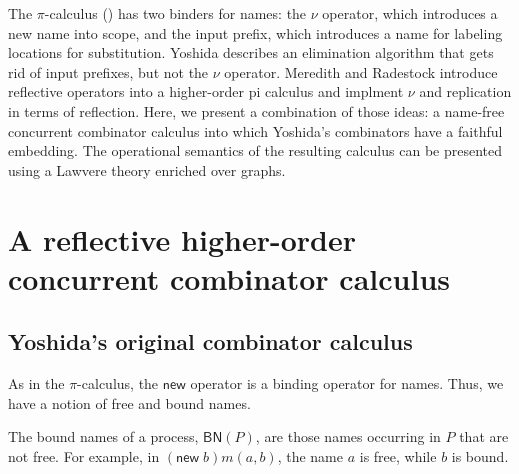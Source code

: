 \documentclass{llncs}
\newcommand{\pic}{$\pi$-calculus}
\newcommand{\pzero}{\mathbin{0}}
\newcommand{\freenames}[1]{\mathbin{\mathsf{FN}(#1)}}
\newcommand{\boundnames}[1]{\mathbin{\mathsf{BN}(#1)}}
\newcommand{\bc}{\mathbin{\mathbf{::=}}}
\newcommand{\bm}{\mathbin{\mathbf\mid}}
\begin{document}
  The {\pic} (\cite{milner91polyadicpi}) has two binders for names: the $\nu$ operator, which introduces a new name into scope, and the input prefix, which introduces a name for labeling locations for substitution.  Yoshida \cite{DBLP:journals/tcs/Yoshida02} describes an elimination algorithm that gets rid of input prefixes, but not the $\nu$ operator.  Meredith and Radestock \cite{DBLP:journals/entcs/MeredithR05} introduce reflective operators into a higher-order pi calculus and implment $\nu$ and replication in terms of reflection.  Here, we present a combination of those ideas: a name-free concurrent combinator calculus into which Yoshida's combinators have a faithful embedding.  The operational semantics of the resulting calculus can be presented using a Lawvere theory enriched over graphs.

\section{A reflective higher-order concurrent combinator calculus}

\subsection{Yoshida's original combinator calculus}


As in the {\pic}, the $\mathsf{new}$ operator is a binding operator
for names. Thus, we have a notion of free and bound names.


The bound names of a process, $\boundnames{P}$, are those names occurring in $P$
that are not free. For example, in $(\mathsf{new}\; b)m(a,b)$, the name $a$ is free, while $b$ is bound.
\end{document}
